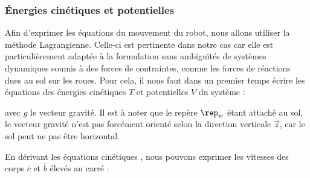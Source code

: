 			
			\subsubsection{Énergies cinétiques et potentielles}
			
			Afin d'exprimer les équations du mouvement du robot, nous allons utiliser la méthode Lagrangienne.
			Celle-ci est pertinente dans notre cas car elle est particulièrement adaptée à la formulation sans ambiguïtés de systèmes dynamiques soumis à des forces de contraintes, comme les forces de réactions dues au sol sur les roues. 
			Pour cela, il nous faut dans un premier temps écrire les équations des énergies cinétiques $T$ et potentielles $V$ du système :
			
			avec $g$ le vecteur gravité. Il est à noter que le repère $\rep_w$ étant attaché au sol, le vecteur gravité n'est pas forcément orienté selon la direction verticale $\vec{z}$, car le sol peut ne pas être horizontal.
			
			En dérivant les équations cinétiques , nous pouvons exprimer les vitesses des corps $\bar{c}$ et $\bar{b}$ élevés au carré :
			
